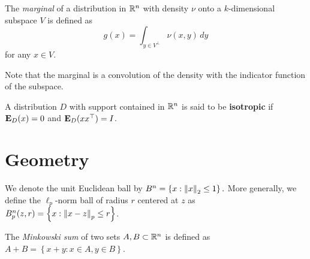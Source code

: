 \begin{defn}
The \emph{marginal} of a distribution in $\mathbb{R}^{n}$ with density $\nu$
onto a $k$-dimensional subspace $V$ is defined as 
\[
g(x)=\int_{y\in V^{\perp}}\nu(x,y)\,dy
\]
for any $x\in V$.

Note that the marginal is a convolution of the density with the indicator
function of the subspace. 
\end{defn}

\begin{defn}
A distribution $D$ with support contained in $\mathbb{R}^{n}$ is said to
be \textbf{isotropic} if $\mathbf{E}_{D}(x)=0$ and $\mathbf{E}_{D}(xx^{\top})=I$. 
\end{defn}


\section*{Geometry}
\begin{defn}
We denote the unit Euclidean ball by $B^{n}=\left\{ x:\left\Vert x\right\Vert_{2}\le1\right\} .$
More generally, we define the $\ell_{p}$-norm ball of radius $r$
centered at $z$ as $B^{n}_{p}(z,r)=\left\{ x:\left\Vert x-z\right\Vert_{p}\le r\right\} $.
\end{defn}

\begin{defn}
The \emph{Minkowski sum} of two sets $A,B\subset\mathbb{R}^{n}$ is defined
as $A+B=\left\{ x+y:x\in A,y\in B\right\} $.
\end{defn}


